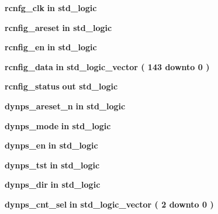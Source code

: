 \begin{DoxyCompactItemize}
\item 
{\bf rcnfg\+\_\+clk}  {\bfseries {\bfseries \textcolor{keywordflow}{in}\textcolor{vhdlchar}{ }}} {\bfseries \textcolor{comment}{std\+\_\+logic}\textcolor{vhdlchar}{ }} 
\item 
{\bf rcnfig\+\_\+areset}  {\bfseries {\bfseries \textcolor{keywordflow}{in}\textcolor{vhdlchar}{ }}} {\bfseries \textcolor{comment}{std\+\_\+logic}\textcolor{vhdlchar}{ }} 
\item 
{\bf rcnfig\+\_\+en}  {\bfseries {\bfseries \textcolor{keywordflow}{in}\textcolor{vhdlchar}{ }}} {\bfseries \textcolor{comment}{std\+\_\+logic}\textcolor{vhdlchar}{ }} 
\item 
{\bf rcnfig\+\_\+data}  {\bfseries {\bfseries \textcolor{keywordflow}{in}\textcolor{vhdlchar}{ }}} {\bfseries \textcolor{comment}{std\+\_\+logic\+\_\+vector}\textcolor{vhdlchar}{ }\textcolor{vhdlchar}{(}\textcolor{vhdlchar}{ }\textcolor{vhdlchar}{ } \textcolor{vhdldigit}{143} \textcolor{vhdlchar}{ }\textcolor{keywordflow}{downto}\textcolor{vhdlchar}{ }\textcolor{vhdlchar}{ } \textcolor{vhdldigit}{0} \textcolor{vhdlchar}{ }\textcolor{vhdlchar}{)}\textcolor{vhdlchar}{ }} 
\item 
{\bf rcnfig\+\_\+status}  {\bfseries {\bfseries \textcolor{keywordflow}{out}\textcolor{vhdlchar}{ }}} {\bfseries \textcolor{comment}{std\+\_\+logic}\textcolor{vhdlchar}{ }} 
\item 
{\bf dynps\+\_\+areset\+\_\+n}  {\bfseries {\bfseries \textcolor{keywordflow}{in}\textcolor{vhdlchar}{ }}} {\bfseries \textcolor{comment}{std\+\_\+logic}\textcolor{vhdlchar}{ }} 
\item 
{\bf dynps\+\_\+mode}  {\bfseries {\bfseries \textcolor{keywordflow}{in}\textcolor{vhdlchar}{ }}} {\bfseries \textcolor{comment}{std\+\_\+logic}\textcolor{vhdlchar}{ }} 
\item 
{\bf dynps\+\_\+en}  {\bfseries {\bfseries \textcolor{keywordflow}{in}\textcolor{vhdlchar}{ }}} {\bfseries \textcolor{comment}{std\+\_\+logic}\textcolor{vhdlchar}{ }} 
\item 
{\bf dynps\+\_\+tst}  {\bfseries {\bfseries \textcolor{keywordflow}{in}\textcolor{vhdlchar}{ }}} {\bfseries \textcolor{comment}{std\+\_\+logic}\textcolor{vhdlchar}{ }} 
\item 
{\bf dynps\+\_\+dir}  {\bfseries {\bfseries \textcolor{keywordflow}{in}\textcolor{vhdlchar}{ }}} {\bfseries \textcolor{comment}{std\+\_\+logic}\textcolor{vhdlchar}{ }} 
\item 
{\bf dynps\+\_\+cnt\+\_\+sel}  {\bfseries {\bfseries \textcolor{keywordflow}{in}\textcolor{vhdlchar}{ }}} {\bfseries \textcolor{comment}{std\+\_\+logic\+\_\+vector}\textcolor{vhdlchar}{ }\textcolor{vhdlchar}{(}\textcolor{vhdlchar}{ }\textcolor{vhdlchar}{ } \textcolor{vhdldigit}{2} \textcolor{vhdlchar}{ }\textcolor{keywordflow}{downto}\textcolor{vhdlchar}{ }\textcolor{vhdlchar}{ } \textcolor{vhdldigit}{0} \textcolor{vhdlchar}{ }\textcolor{vhdlchar}{)}\textcolor{vhdlchar}{ }} 

\end{DoxyCompactItemize}
